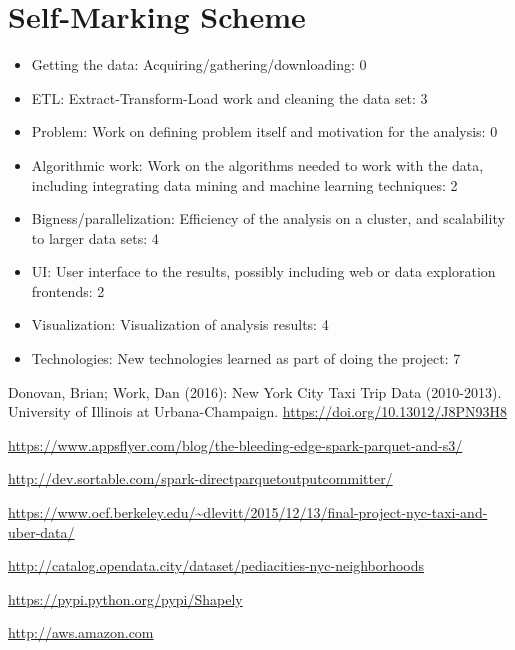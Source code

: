 \documentclass[11pt]{article} %
\begin{document}
\section{Self-Marking Scheme}
\begin{itemize}
\item Getting the data: Acquiring/gathering/downloading: 0
\item ETL: Extract-Transform-Load work and cleaning the data set: 3
\item Problem: Work on defining problem itself and motivation for the analysis: 0
\item Algorithmic work: Work on the algorithms needed to work with the data, including integrating data mining and machine learning techniques: 2
\item Bigness/parallelization: Efficiency of the analysis on a cluster, and scalability to larger data sets: 4
\item UI: User interface to the results, possibly including web or data exploration frontends: 2
\item Visualization: Visualization of analysis results: 4
\item Technologies: New technologies learned as part of doing the project: 7
\end{itemize}

\begin{thebibliography}{9}
Donovan, Brian; Work, Dan (2016): New York City Taxi Trip Data (2010-2013). University of Illinois at Urbana-Champaign. \url{https://doi.org/10.13012/J8PN93H8}
 
\url{https://www.appsflyer.com/blog/the-bleeding-edge-spark-parquet-and-s3/}

\url{http://dev.sortable.com/spark-directparquetoutputcommitter/}

\url{https://www.ocf.berkeley.edu/~dlevitt/2015/12/13/final-project-nyc-taxi-and-uber-data/}

\url{http://catalog.opendata.city/dataset/pediacities-nyc-neighborhoods}

\url{https://pypi.python.org/pypi/Shapely}

\url{http://aws.amazon.com}

\end{thebibliography}
\end{document}
